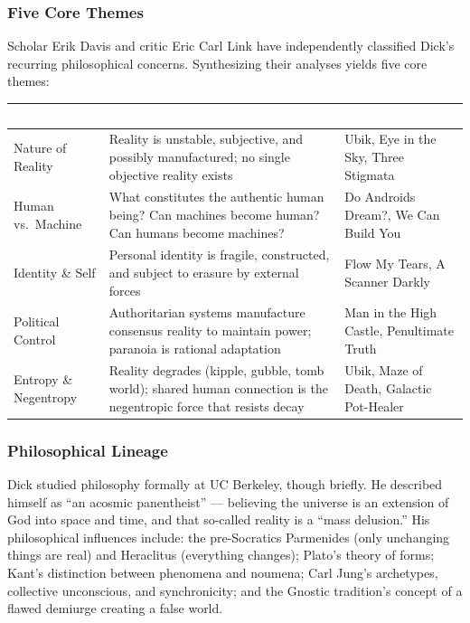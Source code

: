 \documentclass[11pt,letterpaper]{article}
\newcommand{\tableheader}[1]{\textbf{\sffamily\textcolor{white}{#1}}}
\begin{document}
\subsubsection{Five Core Themes}

Scholar Erik Davis and critic Eric Carl Link have independently classified Dick's recurring philosophical concerns. Synthesizing their analyses yields five core themes:

\begin{center}
\begin{tabularx}{\textwidth}{L{3cm}XL{3.5cm}}
\toprule
{}
\tableheader{Theme} & \tableheader{Description} & \tableheader{Key Works} \\
\midrule
Nature of Reality & Reality is unstable, subjective, and possibly manufactured; no single objective reality exists & Ubik, Eye in the Sky, Three Stigmata \\
Human vs.\ Machine & What constitutes the authentic human being? Can machines become human? Can humans become machines? & Do Androids Dream?, We Can Build You \\
Identity \& Self & Personal identity is fragile, constructed, and subject to erasure by external forces & Flow My Tears, A Scanner Darkly \\
Political Control & Authoritarian systems manufacture consensus reality to maintain power; paranoia is rational adaptation & Man in the High Castle, Penultimate Truth \\
Entropy \& Negentropy & Reality degrades (kipple, gubble, tomb world); shared human connection is the negentropic force that resists decay & Ubik, Maze of Death, Galactic Pot-Healer \\
\bottomrule
\end{tabularx}
\end{center}

\subsubsection{Philosophical Lineage}

Dick studied philosophy formally at UC Berkeley, though briefly. He described himself as ``an acosmic panentheist'' --- believing the universe is an extension of God into space and time, and that so-called reality is a ``mass delusion.'' His philosophical influences include: the pre-Socratics Parmenides (only unchanging things are real) and Heraclitus (everything changes); Plato's theory of forms; Kant's distinction between phenomena and noumena; Carl Jung's archetypes, collective unconscious, and synchronicity; and the Gnostic tradition's concept of a flawed demiurge creating a false world.
\end{document}
